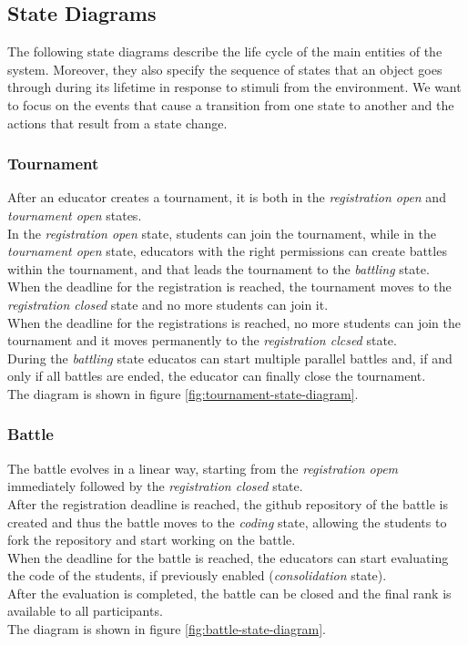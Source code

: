\subsection{State Diagrams}
The following state diagrams describe the life cycle of the main entities of the system.
Moreover, they also specify the sequence of states that an object goes through during its lifetime in response to stimuli from the environment.
We want to focus on the events that cause a transition from one state to another and the actions that result from a state change.

\subsubsection*{Tournament}
After an educator creates a tournament, it is both in the \textit{registration open} and \textit{tournament open} states.\\
In the \textit{registration open} state, students can join the tournament, while in the \textit{tournament open} state, educators with the right permissions can create battles within the tournament, and that leads the tournament to the \textit{battling} state.\\
When the deadline for the registration is reached, the tournament moves to the \textit{registration closed} state and no more students can join it.\\
When the deadline for the registrations is reached, no more students can join the tournament and it moves permanently to the \textit{registration clcsed} state.\\
During the \textit{battling} state educatos can start multiple parallel battles and, if and only if all battles are ended, the educator can finally close the tournament.\\
The diagram is shown in figure \ref{fig:tournament-state-diagram}.

\subsubsection*{Battle}
The battle evolves in a linear way, starting from the \textit{registration opem} immediately followed by the \textit{registration closed} state.\\
After the registration deadline is reached, the github repository of the battle is created and thus the battle moves to the \textit{coding} state, allowing the students to fork the repository and start working on the battle.\\
When the deadline for the battle is reached, the educators can start evaluating the code of the students, if previously enabled (\textit{consolidation} state). \\
After the evaluation is completed, the battle can be closed and the final rank is available to all participants.\\
The diagram is shown in figure \ref{fig:battle-state-diagram}.

